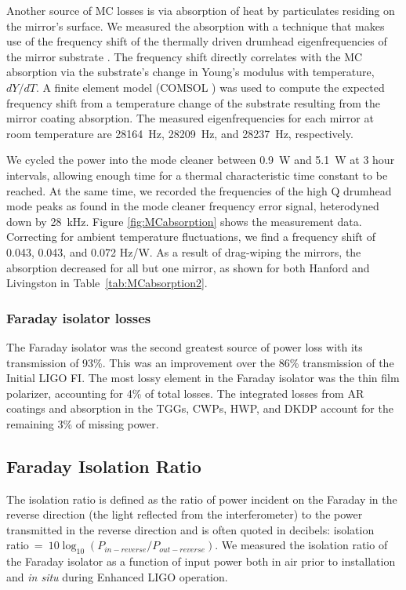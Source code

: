 Another source of MC losses is via absorption of heat by particulates
residing on the mirror's surface. We measured the absorption with a
technique that makes use of the frequency shift of the thermally
driven drumhead eigenfrequencies of the mirror substrate
\citep{Punturo2007Mirror}. The frequency shift directly correlates
with the MC absorption via the substrate's change in Young's modulus
with temperature, $dY/dT$. A finite element model (COMSOL
\cite{COMSOL}) was used to compute the expected frequency shift from a
temperature change of the substrate resulting from the mirror coating
absorption. The measured eigenfrequencies for each mirror at room
temperature are 28164~Hz, 28209~Hz, and 28237~Hz, respectively.

We cycled the power into the mode cleaner between 0.9~W and 5.1~W at 3
hour intervals, allowing enough time for a thermal characteristic time
constant to be reached.  At the same time, we recorded the frequencies
of the high Q drumhead mode peaks as found in the mode cleaner
frequency error signal, heterodyned down by 28~kHz. Figure
\ref{fig:MCabsorption} shows the measurement data. Correcting for
ambient temperature fluctuations, we find a frequency shift of 0.043,
0.043, and 0.072 Hz/W. As a result of drag-wiping the mirrors, the
absorption decreased for all but one mirror, as shown for both Hanford
and Livingston in Table~\ref{tab:MCabsorption2}.


\subsubsection{Faraday isolator losses} 
The Faraday isolator was the second greatest source of power loss with
its transmission of 93\%. This was an improvement over the
86\% transmission of the Initial LIGO FI. The most lossy element in the
Faraday isolator was the thin film polarizer, accounting for 4\% of
total losses. The integrated losses from AR coatings and absorption in the
TGGs, CWPs, HWP, and DKDP account for the remaining 3\% of missing power. 


\subsection{Faraday Isolation Ratio}
The isolation ratio is defined as the ratio of power incident on the
Faraday in the reverse direction (the light reflected from the
interferometer) to the power transmitted in the 
reverse direction and is often quoted in decibels: isolation ratio~=~$10
\log_{10}(P_{in-reverse}/P_{out-reverse})$.  We measured the isolation ratio of the
Faraday isolator as a function of input power both in air prior to
installation and \emph{in situ} during Enhanced LIGO operation.

